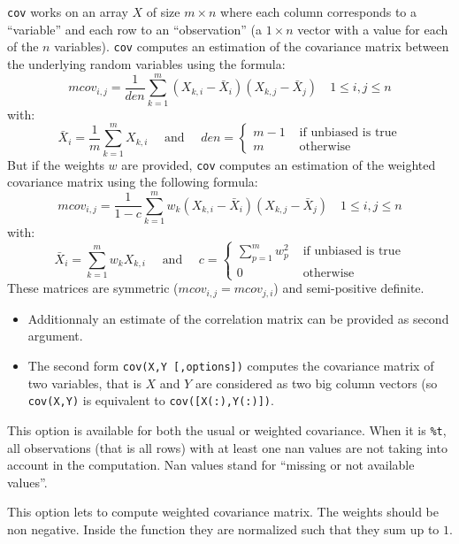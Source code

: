 \begin{mandescription}
  \verb+cov+ works on an array $X$ of size $m \times n$ where each column corresponds to
 a ``variable'' and each row to an ``observation'' (a $1 \times n$ vector with a value 
for each of the $n$ variables). \verb+cov+ computes an estimation of the covariance
matrix between the underlying random variables using the formula:
$$
    mcov_{i,j} = \frac{1}{den} \sum_{k=1}^m (X_{k,i} - \bar{X}_i) (X_{k,j} - \bar{X}_j) \quad 1 \le
   i,j \le n 
$$ 
with:
$$
   \bar{X}_i = \frac{1}{m} \sum_{k=1}^m X_{k,i}
   \quad \mbox{ and } \quad  den = \left\{ \begin{array}{cl}  m-1 & \mbox{ if unbiased is true}\\
                                                       m   & \mbox{ otherwise} \end{array}\right.
$$
But if the  weights $w$ are provided,  \verb+cov+ computes an estimation of the weighted covariance
matrix using the following formula:
$$
     mcov_{i,j} = \frac{1}{1 - c} \sum_{k=1}^m w_k (X_{k,i} - \bar{X}_i) (X_{k,j} - \bar{X}_j) \quad 1 \le
   i,j \le n  
$$
with:
$$
    \bar{X}_i =  \sum_{k=1}^m  w_k X_{k,i}
   \quad \mbox{ and } \quad  c = \left\{ \begin{array}{cl} \sum_{p=1}^m w_p^2  & \mbox{ if unbiased is true}\\
                                                       0   & \mbox{ otherwise} \end{array}\right.
$$
These matrices are symmetric ($mcov_{i,j} = mcov_{j,i}$) and semi-positive definite.

\begin{itemize}
\item Additionnaly an estimate of the correlation matrix can be provided as second argument.

\item The second form  \verb+cov(X,Y [,options])+ computes the covariance matrix
of two variables, that is $X$ and $Y$ are considered as two big column vectors (so \verb+cov(X,Y)+
is equivalent to \verb+cov([X(:),Y(:)])+. 
\end{itemize}


   This option is available for both the usual or weighted covariance.
When it is \verb+%t+, all observations (that is all rows) with at least 
one nan values are not taking into account in the computation.
Nan values stand for ``missing or not available values''.
   
  This option lets to compute weighted covariance matrix. The weights should be non negative. Inside
the function they are normalized such that they sum up to $1$.
   
\end{mandescription}

